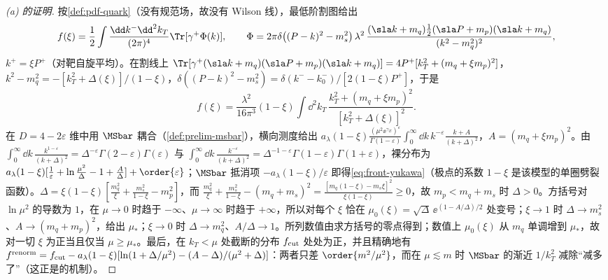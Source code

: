 \begin{proof}[(a) 的证明]
按\cref{def:pdf-quark}（没有规范场，故没有 Wilson 线），最低阶割图给出
\begin{equation*}
f(\xi)=\frac12\int\frac{\dd k^-\dd^2k_T}{(2\pi)^4}\Tr[\gamma^+\Phi(k)],\qquad
\Phi=2\pi\delta\bigl((P-k)^2-m_s^2\bigr)\,\lambda^2\,\frac{(\sla k+m_q)\frac12(\sla P+m_p)(\sla k+m_q)}{(k^2-m_q^2)^2},
\end{equation*}
$k^+=\xi P^+$（对靶自旋平均）。在割线上 $\Tr[\gamma^+(\sla k+m_q)(\sla P+m_p)(\sla k+m_q)]=4P^+[k_T^2+(m_q+\xi m_p)^2]$，$k^2-m_q^2=-[k_T^2+\Delta(\xi)]/(1-\xi)$，$\delta((P-k)^2-m_s^2)=\delta(k^--k^-_0)/[2(1-\xi)P^+]$，于是
\begin{equation*}
f(\xi)=\frac{\lambda^2}{16\pi^3}(1-\xi)\int\dd^2k_T\,\frac{k_T^2+(m_q+\xi m_p)^2}{[k_T^2+\Delta(\xi)]^2}.
\end{equation*}
在 $D=4-2\varepsilon$ 维中用 $\MSbar$ 耦合（\cref{def:prelim-msbar}），横向测度给出 $a_\lambda(1-\xi)\frac{(\mu^2\ee^{\gamma_E})^\varepsilon}{\Gamma(1-\varepsilon)}\int_0^\infty\dd k\,k^{-\varepsilon}\frac{k+A}{(k+\Delta)^2}$，$A=(m_q+\xi m_p)^2$。由 $\int_0^\infty\dd k\,\frac{k^{1-\varepsilon}}{(k+\Delta)^2}=\Delta^{-\varepsilon}\Gamma(2-\varepsilon)\Gamma(\varepsilon)$ 与 $\int_0^\infty\dd k\,\frac{k^{-\varepsilon}}{(k+\Delta)^2}=\Delta^{-1-\varepsilon}\Gamma(1-\varepsilon)\Gamma(1+\varepsilon)$，裸分布为 $a_\lambda(1-\xi)[\frac1\varepsilon+\ln\frac{\mu^2}{\Delta}-1+\frac A\Delta]+\order{\varepsilon}$；$\MSbar$ 抵消项 $-a_\lambda(1-\xi)/\varepsilon$ 即得\cref{eq:front-yukawa}（极点的系数 $1-\xi$ 是该模型的单圈劈裂函数）。$\Delta=\xi(1-\xi)[\frac{m_q^2}\xi+\frac{m_s^2}{1-\xi}-m_p^2]$，而 $\frac{m_q^2}\xi+\frac{m_s^2}{1-\xi}-(m_q+m_s)^2=\frac{[m_q(1-\xi)-m_s\xi]^2}{\xi(1-\xi)}\ge0$，故 $m_p<m_q+m_s$ 时 $\Delta>0$。方括号对 $\ln\mu^2$ 的导数为 $1$，在 $\mu\to0$ 时趋于 $-\infty$、$\mu\to\infty$ 时趋于 $+\infty$，所以对每个 $\xi$ 恰在 $\mu_0(\xi)=\sqrt{\Delta}\,\ee^{(1-A/\Delta)/2}$ 处变号；$\xi\to1$ 时 $\Delta\to m_s^2$、$A\to(m_q+m_p)^2$，给出 $\mu_*$；$\xi\to0$ 时 $\Delta\to m_q^2$、$A/\Delta\to1$。所列数值由求方括号的零点得到；数值上 $\mu_0(\xi)$ 从 $m_q$ 单调增到 $\mu_*$，故对一切 $\xi$ 为正当且仅当 $\mu\ge\mu_*$。最后，在 $k_T<\mu$ 处截断的分布 $f_{\rm cut}$ 处处为正，并且精确地有 $f^{\rm renorm}=f_{\rm cut}-a_\lambda(1-\xi)[\ln(1+\Delta/\mu^2)-(A-\Delta)/(\mu^2+\Delta)]$：两者只差 $\order{m^2/\mu^2}$，而在 $\mu\lesssim m$ 时 $\MSbar$ 的渐近 $1/k_T^2$ 减除“减多了”（这正是\cite[第~VIII.B~节]{CollinsRogersSato2022}的机制）。
\end{proof}

